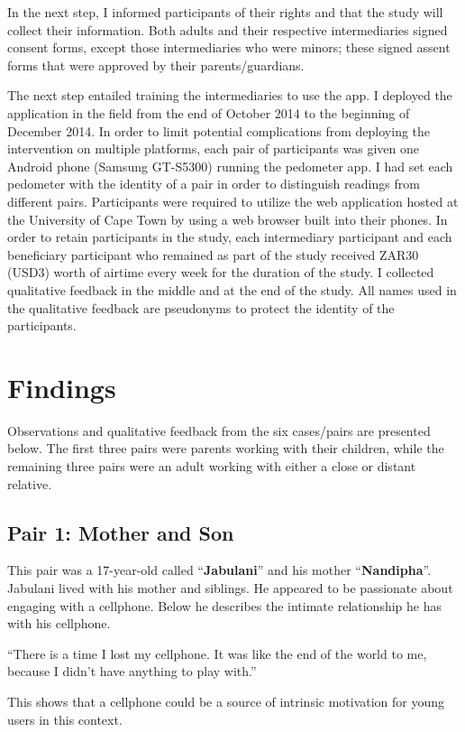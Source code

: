 In the next step, I informed participants of their rights and that the study will collect their information. Both adults and their respective intermediaries signed consent forms, except those intermediaries who were minors; these signed assent forms that were approved by their parents/guardians. 

The next step entailed training the intermediaries to use the app. I deployed the application in the field from the end of October 2014 to the beginning of December 2014. In order to limit potential complications from deploying the intervention on multiple platforms, each pair of participants was given one Android phone (Samsung GT-S5300) running the pedometer app. I had set each pedometer with the identity of a pair in order to distinguish readings from different pairs. Participants were required to utilize the web application hosted at the University of Cape Town by using a web browser built into their phones. In order to retain participants in the study, each intermediary participant and each beneficiary participant who remained as part of the study received ZAR30 (USD3) worth of airtime every week for the duration of the study. I collected qualitative feedback in the middle and at the end of the study. All names used in the qualitative feedback are pseudonyms to protect the identity of the participants.
\section{Findings}
Observations and qualitative feedback from the six cases/pairs are presented below. The first three pairs were parents working with their children, while the remaining three pairs were an adult working with either a close or distant relative.
\subsection*{\textbf{Pair 1: Mother and Son}}
This pair was a 17-year-old called ``\textbf{Jabulani}'' and his mother ``\textbf{Nandipha}''. Jabulani lived with his mother and siblings. He appeared to be passionate about engaging with a cellphone. Below he describes the intimate relationship he has with his cellphone.

 {``There is a time I lost my cellphone. It was like the end of the world to me, because I didn't have anything to play with.''}

This shows that a cellphone could be a source of intrinsic motivation for young users in this context. 

